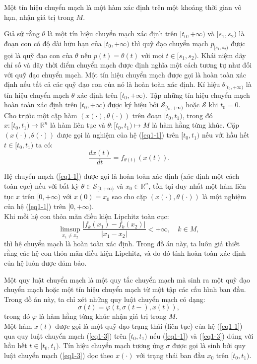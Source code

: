 \documentclass[14pt,a4paper,oneside]{report}		%
\theoremstyle{definition}
\begin{document}
Một tín hiệu chuyển mạch là một hàm xác định trên một khoảng thời gian vô hạn, nhận giá trị trong $M$.

Giả sử rằng $\theta$ là một tín hiệu chuyển mạch xác định trên $[t_0,+\infty)$ và $[s_1,s_2)$ là đoạn con có độ dài hữu hạn của $[t_0,+\infty)$ thì quỹ đạo chuyển mạch $p_{[s_1,s_2)}$ được gọi là quỹ đạo con của $\theta$ nếu $p(t)=\theta(t)$ với mọi $t\in[s_1,s_2)$. Khái niệm dãy chỉ số và dãy thời điểm chuyển mạch được định nghĩa một cách tương tự như đối với quỹ đạo chuyển mạch.
Một tín hiệu chuyển mạch được gọi là hoàn toàn xác định nếu tất cả các quỹ đạo con của nó là hoàn toàn xác định. Kí hiệu $\theta_{[t_0,+\infty)}$ là tín hiệu chuyển mạch $\theta$ xác định trên $[t_0,+\infty)$. Tập những tín hiệu chuyển mạch hoàn toàn xác định trên $[t_0,+\infty)$ được ký hiệu bởi $\mathcal{S}_{[t_0,+\infty)}$ hoặc $\mathcal{S}$ khi $t_0=0$.\\

Cho trước một cặp hàm $(x(\cdot),\theta(\cdot))$ trên đoạn $[t_0,t_1)$, trong đó $x:[t_0,t_1)\mapsto\mathbb{R}^n$ là hàm liên tục và $\theta:[t_0,t_1)\mapsto M$ là hàm hằng từng khúc. Cặp $(x(\cdot),\theta(\cdot))$ được gọi là nghiệm của hệ (\ref{eq1-1}) trên $[t_0,t_1)$ nếu với hầu hết $t\in [t_0,t_1)$ ta có:
$$\frac{dx(t)}{dt}=f_{\theta(t)}(x(t)).$$

Hệ chuyển mạch (\ref{eq1-1}) được gọi là hoàn toàn xác định (xác định một cách toàn cục) nếu với bất kỳ $\theta\in\mathcal{S}_{[0,+\infty)}$ và $x_0\in\mathbb{R}^n$, tồn tại duy nhất một hàm liên tục $x$ trên $[0,+\infty)$ với $x(0)=x_0$ sao cho cặp $(x(\cdot),\theta(\cdot))$ là một nghiệm của hệ (\ref{eq1-1}) trên $[0,+\infty)$.\\
Khi mỗi hệ con thỏa mãn điều kiện Lipchitz toàn cục:
$$\limsup_{x_1\neq x_2}\frac{|f_k(x_1)-f_k(x_2)|}{|x_1-x_2|} < +\infty,\quad k\in M,$$
thì hệ chuyển mạch là hoàn toàn xác định. Trong đồ án này, ta luôn giả thiết rằng các hệ con thỏa mãn điều kiện Lipchitz, và do đó tính hoàn toàn xác định của hệ luôn được đảm bảo.

Một quy luật chuyển mạch là một quy tắc chuyển mạch mà sinh ra một quỹ đạo chuyển mạch hoặc một tín hiệu chuyển mạch từ một tập các cấu hình ban đầu. Trong đồ án này, ta chỉ xét những quy luật chuyển mạch có dạng:
\begin{equation} \label{eq1-3}
\sigma(t)=\varphi(t,\sigma(t-),x(t)),
\end{equation} 
trong đó $\varphi$ là hàm hằng từng khúc nhận giá trị trong $M$.\\
Một hàm $x(t)$ được gọi là một quỹ đạo trạng thái (liên tục) của hệ (\ref{eq1-1}) qua quy luật chuyển mạch (\ref{eq1-3}) trên $[t_0,t_1)$ nếu (\ref{eq1-1}) và (\ref{eq1-3}) đúng với hầu hết $t\in[t_0,t_1)$. Tín hiệu chuyển mạch tương ứng $\sigma$ được gọi là sinh bởi quy luật chuyển mạch (\ref{eq1-3}) dọc theo $x(\cdot)$ với trạng thái ban đầu $x_0$ trên $[t_0,t_1)$.
\end{document}
